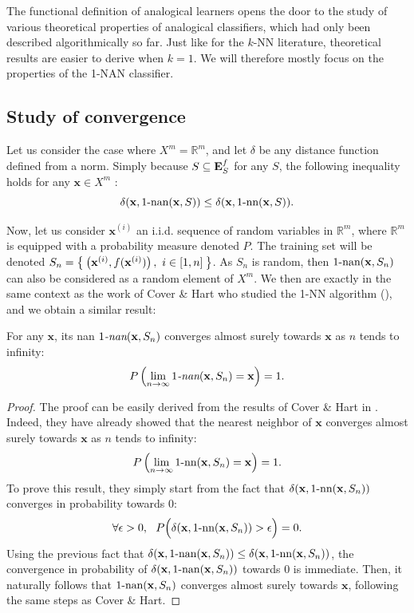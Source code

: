 The functional definition of analogical learners opens the door to the study of
various theoretical properties of analogical classifiers, which had only been
described algorithmically so far. Just like for the $k$-NN literature,
theoretical results are easier to derive when $k = 1$. We will therefore mostly
focus on the properties of the 1-NAN classifier.
\subsection{Study of convergence}

Let us consider the case where $X^m=\mathbb{R}^m$, and let $\delta$ be any
distance function defined from a norm. Simply because $S \subseteq \mathbf{E}_{S}^{f}$ for
any $S$, the
following inequality holds for any $\mathbf{x} \in X^m$ :
$$\delta(\mathbf{x}, 1\text{-nan}(\mathbf{x},S)) \leq \delta(\mathbf{x},
1\mbox{-nn}(\mathbf{x},S)).$$


Now, let us consider  $\mathbf{x}^{(i)}$ an i.i.d. sequence of random variables
in $\mathbb{R}^m$, where $\mathbb{R}^m$ is equipped with a probability measure
denoted $P$. The training set will be denoted
$S_n=\Set{\left(\mathbf{x}^{(i)},f(\mathbf{x}^{(i)}) \right), ~ i
\in [1, n]}$. As $S_n$ is random, then $1\text{-nan}(\mathbf{x},S_n)$ can also be
considered as a random element of $X^m$.  We then are exactly in the same
context as the work of Cover \& Hart who studied the 1-NN algorithm
(\cite{CovHarTIT67}), and we obtain a similar result:
\begin{property}
  \label{PROPER:convergence_nan}
  For any $\mathbf{x}$, its nan $1\emph{-nan}(\mathbf{x}, S_n)$ converges almost
  surely towards $\mathbf{x}$ as $n$ tends to infinity:
  $$P\left(\lim_{n \to \infty} 1\emph{-nan}(\mathbf{x}, S_n) = \mathbf{x}\right) =
  1.$$
\end{property}
\begin{proof}
  The proof can be easily derived from the results of Cover \& Hart in
  \cite{CovHarTIT67}. Indeed, they have already showed that the nearest neighbor of
  $\mathbf{x}$ converges almost surely towards $\mathbf{x}$ as $n$ tends to
  infinity:
  $$P\left(\lim_{n \to \infty} 1\mbox{-nn}(\mathbf{x}, S_n) = \mathbf{x}\right) =
  1.$$
  To prove this result, they simply start from the fact that
  $\delta(\mathbf{x}, 1\mbox{-nn}(\mathbf{x}, S_n))$ converges in probability towards
  $0$:
  $$\forall \epsilon > 0,~~P\Big(\delta(\mathbf{x}, 1\mbox{-nn}(\mathbf{x}, S_n)) >
  \epsilon\Big) = 0.$$
  Using the previous fact that $\delta(\mathbf{x}, 1\text{-nan}(\mathbf{x},S_n)) \leq
  \delta(\mathbf{x}, 1\mbox{-nn}(\mathbf{x},S_n))$, the convergence in probability of
  $\delta(\mathbf{x}, 1\text{-nan}(\mathbf{x},S_n))$ towards $0$ is immediate. Then, it
  naturally follows that $1\text{-nan}(\mathbf{x}, S_n)$ converges almost surely
  towards $\mathbf{x}$, following the same steps as Cover \& Hart.
\end{proof}

